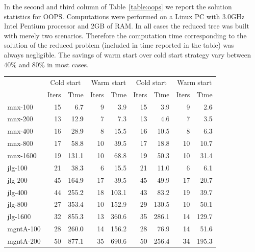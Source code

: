 In the second and third column of Table~\ref{table:oops} 
we report the solution statistics for OOPS.
Computations were performed on a Linux PC with 3.0GHz Intel Pentium
processor and 2GB of RAM.
In all cases the reduced tree was built with merely two scenarios.
Therefore the computation time corresponding to the solution 
of the reduced problem (included in time reported in the table) 
was always negligible. The savings of warm start over cold start 
strategy vary between 40\% and 80\% in most cases.
%
\begin{table}[ht]
  \begin{center}
    \begin{tabular}{|l||rr|rr||rr|rr|} \hline
     \multicolumn{1}{|c||}{\raisebox{-1ex}{Problem}} &
     \multicolumn{2}{c|}{Cold start} &
     \multicolumn{2}{c||}{Warm start} &
     \multicolumn{2}{c|}{Cold start} &
     \multicolumn{2}{c|}{Warm start}\\
              &Iters &   Time &Iters &   Time & Iters &   Time & Iters &   Time  \\ \hline\hline
mnx-100       &   15 &    6.7 &    9 &    3.9 &  15 &    3.9 &   9 &    2.6 \\
mnx-200       &   13 &   12.9 &    7 &    7.3 &  13 &    4.6 &   7 &    3.5 \\
mnx-400       &   16 &   28.9 &    8 &   15.5 &  16 &   10.5 &   8 &    6.3 \\
mnx-800       &   17 &   58.8 &   10 &   39.5 &  17 &   18.8 &  10 &   10.7 \\
mnx-1600      &   19 &  131.1 &   10 &   68.8 &  19 &   50.3 &  10 &   31.4 \\
\hline
jlg-100       &   21 &   38.3 &    6 &   15.5 &  21 &   11.0 &   6 &    6.1 \\
jlg-200       &   45 &  164.9 &   17 &   39.5 &  45 &   49.9 &  17 &   20.7 \\
jlg-400       &   44 &  255.2 &   18 &  103.1 &  43 &   83.2 &  19 &   39.7 \\ %
jlg-800       &   27 &  353.4 &   10 &  152.9 &  29 &  130.5 &  10 &   50.1 \\ %
jlg-1600      &   32 &  855.3 &   13 &  360.6 &  35 &  286.1 &  14 &  129.7 \\ %
\hline
mgntA-100     &   28 &  260.0 &   14 &  156.2 &  28 &   76.9 &  14 &   51.6 \\
mgntA-200     &   50 &  877.1 &   35 &  690.6 &  50 &  256.4 &  34 &  195.3 \\

\end{tabular}
\end{center}
\end{table}
